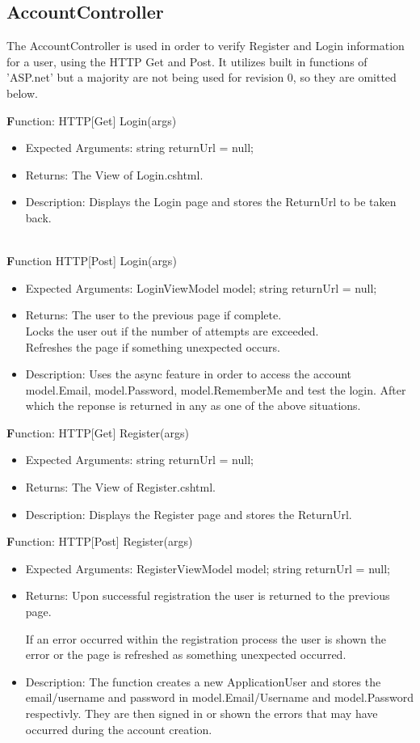 \documentclass{scrreprt}
\begin{document}
\subsection{AccountController}
The AccountController is used in order to verify Register and Login information for a user, using the HTTP Get and Post. It utilizes built in functions of 'ASP.net' but a majority are not being used for revision 0, so they are omitted below.

  \textbf Function:  HTTP[Get] Login(args)
  \begin{itemize}
    \item Expected Arguments:
    string returnUrl = null;
    \item Returns:
    The View of Login.cshtml.
    \item Description:
    Displays the Login page and stores the ReturnUrl to be taken back.
  \end{itemize}
  \\
  \textbf Function HTTP[Post] Login(args)
  \begin{itemize}
    \item Expected Arguments:
    LoginViewModel model;
    string returnUrl = null;
    \item Returns:
    The user to the previous page if complete.
    \\
    Locks the user out if the number of attempts are exceeded.
    \\
    Refreshes the page if something unexpected occurs.
    \item Description:
    Uses the async feature in order to access the account model.Email, model.Password, model.RememberMe and test the login. After which the reponse is returned in any as one of the above situations.
  \end{itemize}

  \textbf Function: HTTP[Get] Register(args)
  \begin{itemize}
    \item Expected Arguments:
    string returnUrl = null;
    \item Returns:
    The View of Register.cshtml.
    \item Description:
    Displays the Register page and stores the ReturnUrl.
  \end{itemize}

  \textbf Function: HTTP[Post] Register(args)
  \begin{itemize}
    \item Expected Arguments:
    RegisterViewModel model;
    string returnUrl = null;
    \item Returns:
    Upon successful registration the user is returned to the previous page. 

    If an error occurred within the registration process the user is shown the error or the page is refreshed as something unexpected occurred.
    \item Description:
    The function creates a new ApplicationUser and stores the email/username and password in model.Email/Username and model.Password respectivly. They are then signed in or shown the errors that may have occurred during the account creation.
  \end{itemize}
\end{document}
